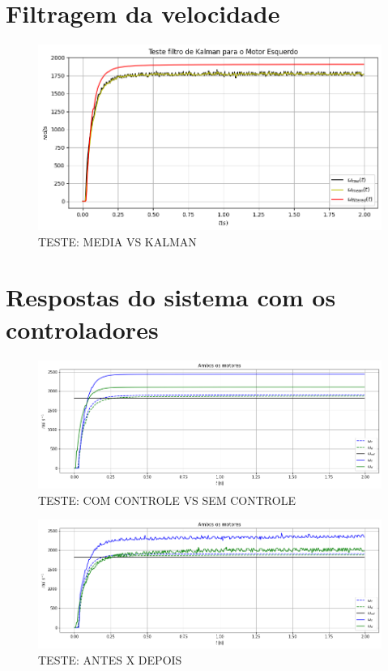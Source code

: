 \section{Filtragem da velocidade}

\begin{figure}[H]
    \centering
    \includegraphics[width=13cm]{figuras/resultados/plot_test_media_x_kalman.png}
    \caption{TESTE: MEDIA VS KALMAN}
\end{figure}

\section{Respostas do sistema com os controladores}


\begin{figure}[H]
    \centering
    \includegraphics[width=13cm]{figuras/resultados/plot_test.png}
    \caption{TESTE: COM CONTROLE VS SEM CONTROLE}
\end{figure}

\begin{figure}[H]
    \centering
    \includegraphics[width=13cm]{figuras/resultados/plot_test_antes_x_depois.png}
    \caption{TESTE: ANTES X DEPOIS}
\end{figure}
